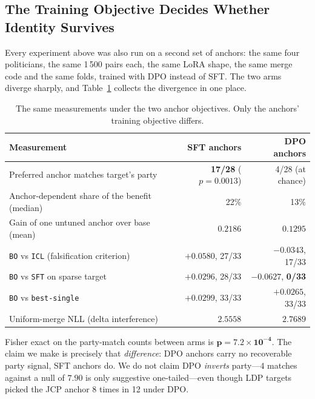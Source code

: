 \documentclass[11pt,letterpaper]{article}
\begin{document}
\subsection{The Training Objective Decides Whether Identity Survives}
\label{sec:objective}
Every experiment above was also run on a second set of anchors: the same four politicians, the same 1\,500 pairs each, the same LoRA shape, the same merge code and the same folds, trained with DPO instead of SFT. The two arms diverge sharply, and Table~\ref{tab:objective} collects the divergence in one place.

\begin{table}[t]
\centering
\caption{The same measurements under the two anchor objectives. Only the anchors' training objective differs.}
\label{tab:objective}
\begin{tabular}{lrr}
\toprule
Measurement & SFT anchors & DPO anchors \\
\midrule
Preferred anchor matches target's party & \textbf{17/28} ($p=0.0013$) & 4/28 (at chance) \\
Anchor-dependent share of the benefit (median) & 22\% & 13\% \\
Gain of one untuned anchor over base (mean) & $0.2186$ & $0.1295$ \\
\texttt{BO} vs \texttt{ICL} (falsification criterion) & $+0.0580$, 27/33 & $-0.0343$, 17/33 \\
\texttt{BO} vs \texttt{SFT} on sparse target & $+0.0296$, 28/33 & $-0.0627$, \textbf{0/33} \\
\texttt{BO} vs \texttt{best-single} & $+0.0299$, 33/33 & $+0.0265$, 33/33 \\
Uniform-merge NLL (delta interference) & $2.5558$ & $2.7689$ \\
\bottomrule
\end{tabular}
\end{table}

Fisher exact on the party-match counts between arms is $\mathbf{p=7.2\times10^{-4}}$. The claim we make is precisely that \emph{difference}: DPO anchors carry no recoverable party signal, SFT anchors do. We do not claim DPO \emph{inverts} party---$4$ matches against a null of $7.90$ is only suggestive one-tailed---even though LDP targets picked the JCP anchor 8 times in 12 under DPO.
\end{document}

